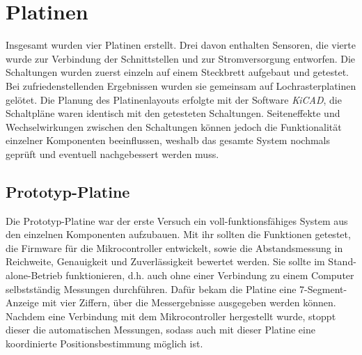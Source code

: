 
\chapter{Platinen}
Insgesamt wurden vier Platinen erstellt. Drei davon enthalten Sensoren, die vierte wurde zur Verbindung der Schnittstellen und zur Stromversorgung entworfen. Die Schaltungen wurden zuerst einzeln auf einem Steckbrett aufgebaut und getestet. Bei zufriedenstellenden Ergebnissen wurden sie gemeinsam auf Lochrasterplatinen gelötet. Die Planung des Platinenlayouts erfolgte mit der Software \textit{KiCAD}, die Schaltpläne waren identisch mit den getesteten Schaltungen. Seiteneffekte und Wechselwirkungen zwischen den Schaltungen können jedoch die Funktionalität einzelner Komponenten beeinflussen, weshalb das gesamte System nochmals geprüft und eventuell nachgebessert werden muss.


\section{Prototyp-Platine}
Die Prototyp-Platine war der erste Versuch ein voll-funktionsfähiges System aus den einzelnen Komponenten aufzubauen. Mit ihr sollten die Funktionen getestet, die Firmware für die Mikrocontroller entwickelt, sowie die Abstandsmessung in Reichweite, Genauigkeit und Zuverlässigkeit bewertet werden. Sie sollte im Stand-alone-Betrieb funktionieren, d.h. auch ohne einer Verbindung zu einem Computer selbstständig Messungen durchführen. Dafür bekam die Platine eine 7-Segment-Anzeige mit vier Ziffern, über die Messergebnisse ausgegeben werden können. Nachdem eine Verbindung mit dem Mikrocontroller hergestellt wurde, stoppt dieser die automatischen Messungen, sodass auch mit dieser Platine eine koordinierte Positionsbestimmung möglich ist.

